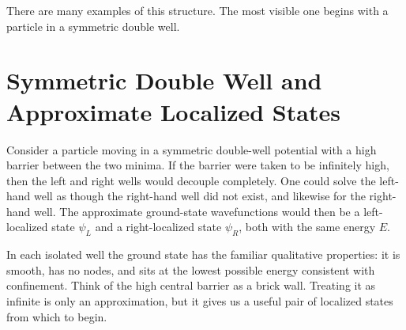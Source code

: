 There are many examples of this structure. The most visible one begins with a particle in a symmetric double well.

\section{Symmetric Double Well and Approximate Localized States}

Consider a particle moving in a symmetric double-well potential with a high barrier between the two minima. If the barrier were taken to be infinitely high, then the left and right wells would decouple completely. One could solve the left-hand well as though the right-hand well did not exist, and likewise for the right-hand well. The approximate ground-state wavefunctions would then be a left-localized state \(\psi_L\) and a right-localized state \(\psi_R\), both with the same energy \(E\).

In each isolated well the ground state has the familiar qualitative properties: it is smooth, has no nodes, and sits at the lowest possible energy consistent with confinement. Think of the high central barrier as a brick wall. Treating it as infinite is only an approximation, but it gives us a useful pair of localized states from which to begin.

